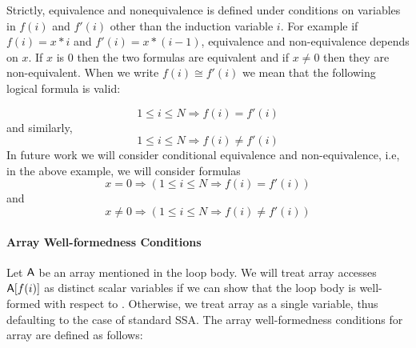 Strictly, equivalence and nonequivalence is defined under conditions on variables in $f(i)$ and $f'(i)$ 
other than the induction variable $i$. For example if $f(i) = x*i$ and $f'(i) = x*(i-1)$, equivalence and non-equivalence 
depends on $x$. If $x$ is 0 then the two formulas are equivalent and if $x \neq 0$ then they are non-equivalent. 
When we write $f(i) \cong f'(i)$ we mean that the following logical formula is valid:

\begin{equation}
1 \le i \le N \Rightarrow f(i) = f'(i) 
\end{equation}
and similarly, 
\begin{equation}
1 \le i \le N \Rightarrow f(i) \neq f'(i) 
\end{equation}
In future work we will consider conditional equivalence and non-equivalence, i.e, in the above example, we will 
consider formulas
\begin{equation}
x = 0 \Rightarrow (1 \le i \le N \Rightarrow f(i) = f'(i)) 
\end{equation}
and
\begin{equation}
x \ne 0 \Rightarrow (1 \le i \le N \Rightarrow f(i) \neq f'(i) ) 
\end{equation}

\paragraph{Array Well-formedness Conditions} Let ${{\sf A}}$ be an array mentioned in the loop body. 
We will treat array accesses ${{\sf A}}[f(i)]$ as distinct scalar variables if we can show that the loop body is
well-formed with respect to \A. Otherwise, we treat array {\A} as a single variable, thus defaulting to the 
case of standard SSA. The array well-formedness conditions for array {\A} are defined as follows: 

